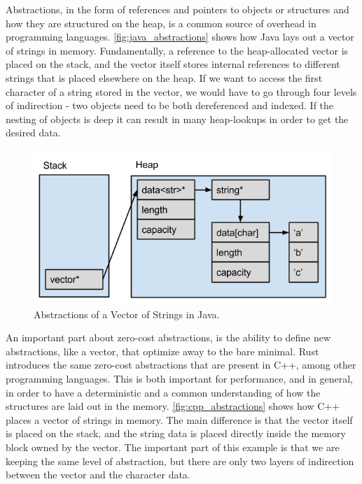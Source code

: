 Abstractions, in the form of references and pointers to objects or structures and how they are
structured on the heap, is a common source of overhead in programming languages.
\autoref{fig:java_abstractions}  shows how Java lays out a vector of
strings in memory.
Fundamentally, a reference to the heap-allocated vector is placed on the stack, and the vector itself stores internal references to different strings that is placed elsewhere on the heap.
If we want to access the first character of a string stored in the vector, we would have to go through four levels of indirection - two objects need to be both dereferenced and indexed.
If the nesting of objects is deep it can result in many heap-lookups in order to get the desired data.

\begin{figure}[tb]
  \begin{center}
    \includegraphics[scale=0.5]{figures/java_abstractions}
  \end{center}
  \caption{Abstractions of a Vector of Strings in Java.}
  \label{fig:java_abstractions}
\end{figure}

An important part about zero-cost abstractions, is the ability to define new abstractions, like a vector, that optimize away to the bare minimal.
Rust introduces the same zero-cost abstractions that are present in C++, among other programming languages.
This is both important for performance, and in general, in order to have a deterministic and a common understanding of how the structures are laid out in the memory.
\autoref{fig:cpp_abstractions} shows how C++ places a vector of strings in memory.
The main difference is that the vector itself is placed on the stack, and the string data is placed directly inside the memory block owned by the vector.
The important part of this example is that we are keeping the same level of abstraction, but there are only two layers of indirection between the vector and the character data.

